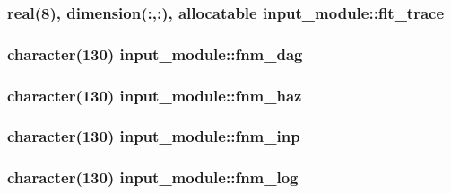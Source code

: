 \subsubsection[{flt\+\_\+trace}]{\setlength{\rightskip}{0pt plus 5cm}real(8), dimension(\+:,\+:), allocatable input\+\_\+module\+::flt\+\_\+trace}\label{namespaceinput__module_a289e412144c4ad26f482d664135f3972}
\hypertarget{namespaceinput__module_ae99c24908c83beaac79f68a46d079e37}{}
\subsubsection[{fnm\+\_\+dag}]{\setlength{\rightskip}{0pt plus 5cm}character(130) input\+\_\+module\+::fnm\+\_\+dag}\label{namespaceinput__module_ae99c24908c83beaac79f68a46d079e37}
\hypertarget{namespaceinput__module_ab37b626c8a9c8a0ad42d001c9a0e5ac4}{}
\subsubsection[{fnm\+\_\+haz}]{\setlength{\rightskip}{0pt plus 5cm}character(130) input\+\_\+module\+::fnm\+\_\+haz}\label{namespaceinput__module_ab37b626c8a9c8a0ad42d001c9a0e5ac4}
\hypertarget{namespaceinput__module_ad228ac099c1afd318803f2d8514dd2c9}{}
\subsubsection[{fnm\+\_\+inp}]{\setlength{\rightskip}{0pt plus 5cm}character(130) input\+\_\+module\+::fnm\+\_\+inp}\label{namespaceinput__module_ad228ac099c1afd318803f2d8514dd2c9}
\hypertarget{namespaceinput__module_a95df80960079d35b95016b2448da8dcc}{}
\subsubsection[{fnm\+\_\+log}]{\setlength{\rightskip}{0pt plus 5cm}character(130) input\+\_\+module\+::fnm\+\_\+log}\label{namespaceinput__module_a95df80960079d35b95016b2448da8dcc}
\hypertarget{namespaceinput__module_a913978d3f2a95df35b24c099c6599cd0}{}
